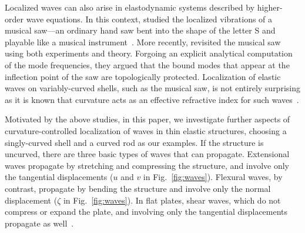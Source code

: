 Localized waves can also arise in elastodynamic systems described by higher-order wave equations.
In this context, \citet{scott1992} studied the localized vibrations of a musical saw---an ordinary hand saw bent into the shape of the letter \textsf{S} and playable like a musical instrument~\cite{leonard1989,stuckenbruck2016}.
More recently, \citet{shankar2022} revisited the musical saw using both experiments and theory.
Forgoing an explicit analytical computation of the mode frequencies, they argued that the bound modes that appear at the inflection point of the saw are topologically protected.
Localization of elastic waves on variably-curved shells, such as the musical saw, is not entirely surprising as it is known that curvature acts as an effective refractive index for such waves~\cite{norris1994,evans2013}.

Motivated by the above studies, in this paper, we investigate further aspects of curvature-controlled localization of waves in thin elastic structures, choosing a singly-curved shell and a curved rod as our examples.
If the structure is uncurved, there are three basic types of waves that can propagate.
Extensional waves propagate by stretching and compressing the structure, and involve only the tangential displacements ($u$ and $v$ in Fig.~\ref{fig:waves}).
Flexural waves, by contrast, propagate by bending the structure and involve only the normal displacement ($\zeta$ in Fig.~\ref{fig:waves}).
In flat plates, shear waves, which do not compress or expand the plate, and involving only the tangential displacements propagate as well~\cite{landau1986}.

